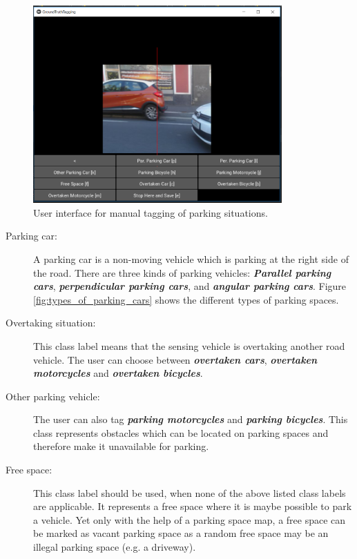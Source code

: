 \begin{figure}
	\centering
	\includegraphics[width=0.85\textwidth]{img/ground_truth_tagging_ui.PNG}
	\caption{User interface for manual tagging of parking situations. }
	\label{fig:ground_truth_tagging_ui}
\end{figure}

\begin{description}

\item[Parking car:] A parking car is a non-moving vehicle which is parking at the right side of the road. There are three kinds of parking vehicles: \textbf{\textit{Parallel parking cars}}, \textbf{\textit{perpendicular parking cars}}, and \textbf{\textit{angular parking cars}}. Figure \ref{fig:types_of_parking_cars} shows the different types of parking spaces.

\item[Overtaking situation:] This class label means that the sensing vehicle is overtaking another road vehicle. The user can choose between \textbf{\textit{overtaken cars}}, \textbf{\textit{overtaken motorcycles}} and \textbf{\textit{overtaken bicycles}}.

\item[Other parking vehicle:] The user can also tag \textbf{\textit{parking motorcycles}} and \textbf{\textit{parking bicycles}}. This class represents obstacles which can be located on parking spaces and therefore make it unavailable for parking.

\item[Free space:] This class label should be used, when none of the above listed class labels are applicable. It represents a free space where it is maybe possible to park a vehicle. Yet only with the help of a parking space map, a free space can be marked as vacant parking space as a random free space may be an illegal parking space (e.g. a driveway).

\end{description}



